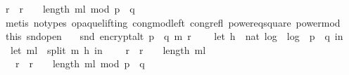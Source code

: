 \begin{isabellebody}
{\isacharasterisk}{\kern0pt}\ {\isacharparenleft}{\kern0pt}r\ {\isacharasterisk}{\kern0pt}\ r{\isacharparenright}{\kern0pt}\ {\isacharcircum}{\kern0pt}\ {\isacharparenleft}{\kern0pt}{}\ {\isacharcircum}{\kern0pt}\ {\isacharparenleft}{\kern0pt}length\ m{\isacharunderscore}{\kern0pt}l{\isacharparenright}{\kern0pt}{\isacharparenright}{\kern0pt}{\isacharparenright}{\kern0pt}{\isacharbrackright}{\kern0pt}\ {\isacharparenleft}{\kern0pt}mod\ {\isacharparenleft}{\kern0pt}p\ {\isacharasterisk}{\kern0pt}\ q{\isacharparenright}{\kern0pt}{\isacharparenright}{\kern0pt}{\isachardoublequoteclose}\ \isanewline
\ \ \isamarkupfalse%
\ {\isacharparenleft}{\kern0pt}metis\ {\isacharparenleft}{\kern0pt}no{\isacharunderscore}{\kern0pt}types{\isacharcomma}{\kern0pt}\ opaque{\isacharunderscore}{\kern0pt}lifting{\isacharparenright}{\kern0pt}\ cong{\isacharunderscore}{\kern0pt}mod{\isacharunderscore}{\kern0pt}left\ cong{\isacharunderscore}{\kern0pt}refl\ power{}{\isacharunderscore}{\kern0pt}eq{\isacharunderscore}{\kern0pt}square\ power{\isacharunderscore}{\kern0pt}mod{\isacharparenright}{\kern0pt}\isanewline
\isanewline
\isanewline
\ \ \isamarkupfalse%
\ this\ snd{\isacharunderscore}{\kern0pt}open\ \ \isamarkupfalse%
\ {\isachardoublequoteopen}snd\ {\isacharparenleft}{\kern0pt}encrypt{\isacharunderscore}{\kern0pt}alt\ {\isacharparenleft}{\kern0pt}p\ {\isacharasterisk}{\kern0pt}\ q{\isacharparenright}{\kern0pt}\ m\ r{\isacharparenright}{\kern0pt}\ \isanewline
\ \ {\isacharequal}{\kern0pt}\ {\isacharparenleft}{\kern0pt}let\ h\ {\isacharequal}{\kern0pt}\ nat\ {\isasymlfloor}log\ {}\ {\isacharparenleft}{\kern0pt}log\ {}\ {\isacharparenleft}{\kern0pt}p\ {\isacharasterisk}{\kern0pt}\ q{\isacharparenright}{\kern0pt}{\isacharparenright}{\kern0pt}{\isasymrfloor}\ in\ \isanewline
\ \ let\ m{\isacharunderscore}{\kern0pt}l\ {\isacharequal}{\kern0pt}\ split\ m\ h\ in\ \ \isanewline
\ \ {\isacharparenleft}{\kern0pt}r\ {\isacharasterisk}{\kern0pt}\ r{\isacharparenright}{\kern0pt}\ {\isacharcircum}{\kern0pt}\ {\isacharparenleft}{\kern0pt}{}\ {\isacharcircum}{\kern0pt}\ {\isacharparenleft}{\kern0pt}length\ m{\isacharunderscore}{\kern0pt}l{\isacharparenright}{\kern0pt}{\isacharparenright}{\kern0pt}\isanewline
\ \ {\isacharasterisk}{\kern0pt}\ {\isacharparenleft}{\kern0pt}r\ {\isacharasterisk}{\kern0pt}\ r{\isacharparenright}{\kern0pt}\ {\isacharcircum}{\kern0pt}\ {\isacharparenleft}{\kern0pt}{}\ {\isacharcircum}{\kern0pt}\ {\isacharparenleft}{\kern0pt}length\ m{\isacharunderscore}{\kern0pt}l{\isacharparenright}{\kern0pt}{\isacharparenright}{\kern0pt}{\isacharparenright}{\kern0pt}\ mod\ {\isacharparenleft}{\kern0pt}p\ {\isacharasterisk}{\kern0pt}\ q{\isacharparenright}{\kern0pt}{\isachardoublequoteclose}\ \isanewline

\end{isabellebody}
